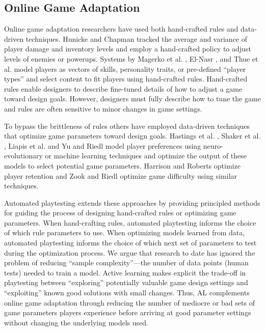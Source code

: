 \documentclass{sig-alternate}
\begin{document}
\subsection{Online Game Adaptation}
Online game adaptation researchers have used both hand-crafted rules and data-driven techniques.
Hunicke and Chapman \cite{hunicke2004:dda} tracked the average and variance of player damage and inventory levels and employ a hand-crafted policy to adjust levels of enemies or powerups. 
Systems by Magerko et al. \cite{magerko2006:isat}, El-Nasr \cite{seifel-nasr2007:mirage}, and Thue et al. \cite{thue2007:storytell-pm} model players as vectors of skills, personality traits, or pre-defined ``player types'' and select content to fit players using hand-crafted rules. %
Hand-crafted rules enable designers to describe fine-tuned details of how to adjust a game toward design goals.
However, designers must fully describe how to tune the game and rules are often sensitive to minor changes in game settings.

To bypass the brittleness of rules others have employed data-driven techniques that optimize game parameters toward design goals.
Hastings et al. \cite{hastings2009:gar}, Shaker et al. \cite{shaker2013:crowdsource-platform-aesthetics}, Liapis et al. \cite{liapis2013:rank-based-interactive-evol} and Yu and Riedl \cite{yu2013:storyeti} model player preferences using neuro-evolutionary or machine learning techniques and optimize the output of these models to select potential game parameters.
Harrison and Roberts \cite{harrison2013:scrabble-retention} optimize player retention and Zook and Riedl \cite{zook2012:tf} optimize game difficulty using similar techniques.

Automated playtesting extends these approaches by providing principled methods for guiding the process of designing hand-crafted rules or optimizing game parameters.
When hand-crafting rules, automated playtesting informs the choice of which rule parameters to use.
When optimizing models learned from data, automated playtesting informs the choice of which next set of parameters to test during the optimization process.
We argue that research to date has ignored the problem of reducing ``sample complexity''---the number of data points (human tests) needed to train a model.
Active learning makes explicit the trade-off in playtesting between ``exploring'' potentially valuable game design settings and ``exploiting'' known good solutions with small changes.
Thus, AL complements online game adaptation through reducing the number of mediocre or bad sets of game parameters players experience before arriving at good parameter settings without changing the underlying models used.
\end{document}
